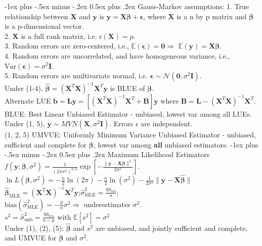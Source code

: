 \documentclass[10pt,landscape]{article}
\makeatletter
\renewcommand{\subsection}{\@startsection{subsection}{2}{0mm}%
                                {-1ex plus -.5ex minus -.2ex}%
                                {0.5ex plus .2ex}%
                                {\normalfont\small\bfseries}}
\makeatother
\begin{document}
\begin{multicols}{3}
\subsection{Gauss-Markov assumptions:}
1. True relationship between $\mathbf X$ and $\mathbf y$ is $\mathbf y= \mathbf X \boldsymbol\beta+ \boldsymbol\epsilon$, where $\mathbf X$ is a n by p matrix and $\boldsymbol\beta$ is a p-dimensional vector.\\
2. $\mathbf X$ is a full rank matrix, i.e. $\mathrm{r}( \mathbf X) = p$.\\
3. Random errors are zero-centered, i.e., $\mathbb E( \boldsymbol\epsilon)= \boldsymbol 0$$\Rightarrow$ $\mathbb E(\mathbf y)=\mathbf X \boldsymbol\beta$.\\
4. Random errors are uncorrelated, and have homogeneous variance, i.e., $\mathrm{Var}(\boldsymbol\epsilon)=\sigma^2 \mathbf I$.\\
5. Random errors are multivariate normal, i.e. $\boldsymbol\epsilon\sim\mathcal N(\boldsymbol0, \sigma^2 \mathbf I)$.\\
\medskip
Under (1-4), $\widehat{\boldsymbol\beta}=(\mathbf X^T\mathbf X)^{-1}\mathbf X^T\mathbf y$ is BLUE of $\boldsymbol\beta$.\\
Alternate LUE $\mathbf b=\mathbf L\mathbf y=[(\mathbf X^T\mathbf X)^{-1}\mathbf X^T + \mathbf B]\mathbf y$ where $\mathbf B= \mathbf L-(\mathbf X^T\mathbf X)^{-1}\mathbf X^T$.\\
BLUE: Best Linear Unbiased Estimator - unbiased, lowest var among all LUEs.\\
\medskip
Under (1, 5), $\mathbf y\sim MVN(\mathbf X, \sigma^2 \mathbf I)$. Errors $\epsilon$ are independent.\\
(1, 2, 5) UMVUE: Uniformly Minimum Variance Unbiased Estimator - unbiased, sufficient and complete for $\boldsymbol\beta$, lowest var among \textbf{all} unbiased estimators.
\medskip
\subsection{Maximum Likelihood Estimators}
$f(\mathbf y; \boldsymbol\beta, \sigma^2)=\frac{1}{(2\pi\sigma^2)^{n/2} }\exp\left[-\frac{\|\mathbf y-\mathbf X\boldsymbol\beta\|^2}{2\sigma^2}\right]$.\\
$\ln L(\boldsymbol\beta, \sigma^2) = -\frac{n}{2}\ln(2\pi)-\frac{n}{2}\ln(\sigma^2)-\frac{1}{2\sigma^2}\|\mathbf y-\mathbf X\widehat{\boldsymbol\beta}\|$\\
\medskip
$\widehat{\boldsymbol{\beta}}_{\mathrm{MLE}}= (\mathbf{X}^T \mathbf{X})^{-1}\mathbf{X}^T \mathbf{y} $;\quad$\widehat{\sigma}^2_{\mathrm{MLE}} = \frac{\mathrm{SS}_\mathrm{res}}{n}$;\\
$\mathrm{bias}(\widehat{\sigma}^2_{\mathrm{MLE}})=-\frac{p}{n}\sigma^2\Rightarrow$ underestimates $\sigma^2$.\\
$s^2 = \widehat{\sigma}^2_{\mathrm{unb}} = \frac{\mathrm{SS}_\mathrm{res}}{n-p}$ with $\mathbb{E}[s^2]=\sigma^2$\\
\medskip
Under (1), (2), (5): $\widehat{\boldsymbol{\beta}}$ and $s^2$ are unbiased, and jointly sufficient and complete, and UMVUE for $\boldsymbol{\beta}$ and $\sigma^2$.\\
\medskip

\end{multicols}
\end{document}
